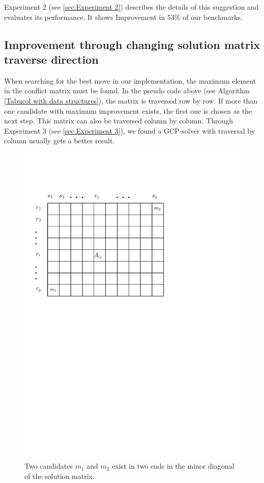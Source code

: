\documentclass[12pt,a4paper,twoside]{scrartcl}
\numberwithin{equation}{section}
\begin{document}
Experiment 2 (see \ref{sec:Experiment 2}) describes the details of this suggestion and evaluates its performance. It shows Improvement in $53\%$ of our benchmarks.
\subsection{Improvement through changing solution matrix traverse direction}
\label{subsec:traverse}
When searching for the best move in our implementation, the maximum element in the conflict matrix must be found. In the pseudo code above (see Algorithm \ref{Tabucol with data structures}), the matrix is  traversed row by row. If more than one candidate with maximum improvement exists, the first one is chosen as the next step. This matrix can also be traversed column by column. Through Experiment 3 (see \ref{sec:Experiment 3}), we found a GCP-solver with traversal by column usually gets a better result.  
\iffalse
\begin{figure}[h!]
\centering
  \includegraphics[scale = 0.5]{1/matrixC.pdf}
  \caption{Two candidates $m_1$ and $m_2$ exist in two ends in the minor diagonal of the solution matrix.}
  \label{fig:maC}
  \end{figure}
\end{document}
